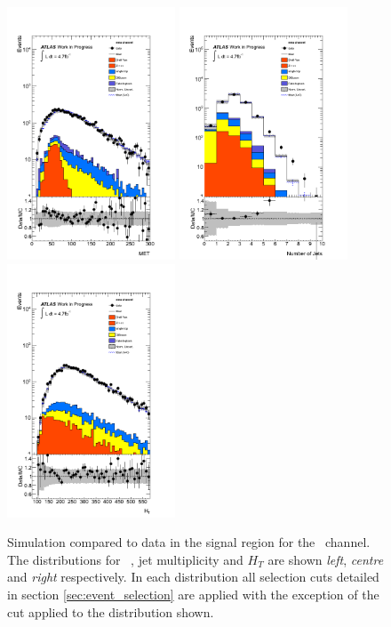 \begin{figure}[htbp!]
     \begin{center}
     \includegraphics[width=50mm]{f/emu_control_sig_met_central_double}
     \includegraphics[width=50mm]{f/emu_control_sig_njet_central_double}
     \includegraphics[width=50mm]{f/emu_control_sig_ht_central_double}
     \end{center}
     \caption{Simulation compared to data in the signal region for the \emu\ channel. The distributions for \etmiss\ , jet multiplicity and $H_T$ are shown \emph{left}, \emph{centre} and \emph{right} respectively. In each distribution all selection cuts detailed in section \ref{sec:event_selection} are applied with the exception of the cut applied to the distribution shown.}
     \label{fig:dilep_control_sig_emu}
    \end{figure}

